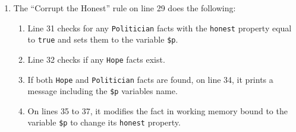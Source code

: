 \begin{enumerate}[topsep=2pt,itemsep=2pt,partopsep=2pt, parsep=2pt]
\begin{enumerate}[topsep=2pt,itemsep=2pt,partopsep=2pt, parsep=2pt]
    \end{enumerate}
    \item The ``Corrupt the Honest'' rule on line 29 does the following:
    \begin{enumerate}[topsep=2pt,itemsep=2pt,partopsep=2pt, parsep=2pt]
        \setlength\itemsep{0em}
        \item Line 31 checks for any \texttt{Politician} facts with the \texttt{honest} property equal to \texttt{true} and sets them to the variable \texttt{\$p}.
        \item Line 32 checks if any \texttt{Hope} facts exist.
        \item If both \texttt{Hope} and \texttt{Politician} facts are found, on line 34, it prints a message including the \texttt{\$p} variables name.
        \item On lines 35 to 37, it modifies the fact in working memory bound to the variable \texttt{\$p} to change its \texttt{honest} property.
    \end{enumerate}
\end{enumerate}